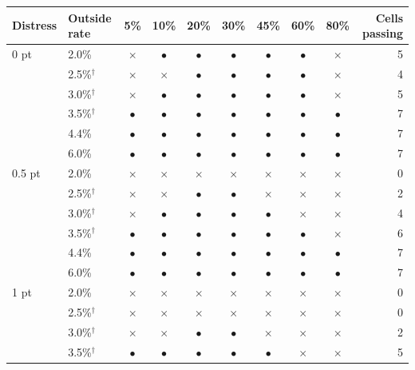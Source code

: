 \begin{tabular}{llcccccccr}
\toprule
Distress & Outside rate & 5\% & 10\% & 20\% & 30\% & 45\% & 60\% & 80\% & Cells passing \\
\midrule
0 pt & 2.0\% & $\times$ & $\bullet$ & $\bullet$ & $\bullet$ & $\bullet$ & $\bullet$ & $\times$ & 5 \\
 & 2.5\%$^{\dagger}$ & $\times$ & $\times$ & $\bullet$ & $\bullet$ & $\bullet$ & $\bullet$ & $\times$ & 4 \\
 & 3.0\%$^{\dagger}$ & $\times$ & $\bullet$ & $\bullet$ & $\bullet$ & $\bullet$ & $\bullet$ & $\times$ & 5 \\
 & 3.5\%$^{\dagger}$ & $\bullet$ & $\bullet$ & $\bullet$ & $\bullet$ & $\bullet$ & $\bullet$ & $\bullet$ & 7 \\
 & 4.4\% & $\bullet$ & $\bullet$ & $\bullet$ & $\bullet$ & $\bullet$ & $\bullet$ & $\bullet$ & 7 \\
 & 6.0\% & $\bullet$ & $\bullet$ & $\bullet$ & $\bullet$ & $\bullet$ & $\bullet$ & $\bullet$ & 7 \\
\midrule
0.5 pt & 2.0\% & $\times$ & $\times$ & $\times$ & $\times$ & $\times$ & $\times$ & $\times$ & 0 \\
 & 2.5\%$^{\dagger}$ & $\times$ & $\times$ & $\bullet$ & $\bullet$ & $\times$ & $\times$ & $\times$ & 2 \\
 & 3.0\%$^{\dagger}$ & $\times$ & $\bullet$ & $\bullet$ & $\bullet$ & $\bullet$ & $\times$ & $\times$ & 4 \\
 & 3.5\%$^{\dagger}$ & $\bullet$ & $\bullet$ & $\bullet$ & $\bullet$ & $\bullet$ & $\bullet$ & $\times$ & 6 \\
 & 4.4\% & $\bullet$ & $\bullet$ & $\bullet$ & $\bullet$ & $\bullet$ & $\bullet$ & $\bullet$ & 7 \\
 & 6.0\% & $\bullet$ & $\bullet$ & $\bullet$ & $\bullet$ & $\bullet$ & $\bullet$ & $\bullet$ & 7 \\
\midrule
1 pt & 2.0\% & $\times$ & $\times$ & $\times$ & $\times$ & $\times$ & $\times$ & $\times$ & 0 \\
 & 2.5\%$^{\dagger}$ & $\times$ & $\times$ & $\times$ & $\times$ & $\times$ & $\times$ & $\times$ & 0 \\
 & 3.0\%$^{\dagger}$ & $\times$ & $\times$ & $\bullet$ & $\bullet$ & $\times$ & $\times$ & $\times$ & 2 \\
 & 3.5\%$^{\dagger}$ & $\bullet$ & $\bullet$ & $\bullet$ & $\bullet$ & $\bullet$ & $\times$ & $\times$ & 5 \\

\end{tabular}
